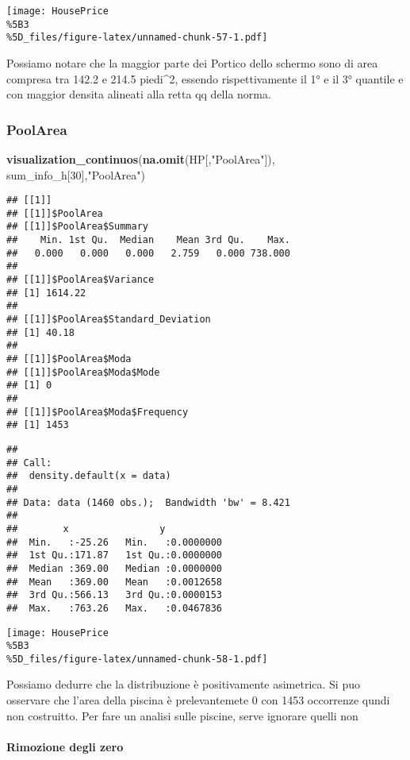 \documentclass[
]{article}
\newenvironment{Shaded}{\begin{snugshade}}{\end{snugshade}}
\newcommand{\DecValTok}[1]{\textcolor[rgb]{0.00,0.00,0.81}{#1}}
\newcommand{\FunctionTok}[1]{\textcolor[rgb]{0.13,0.29,0.53}{\textbf{#1}}}
\newcommand{\NormalTok}[1]{#1}
\newcommand{\StringTok}[1]{\textcolor[rgb]{0.31,0.60,0.02}{#1}}
\begin{document}
\texttt{[image: HousePrice\\\%5B3\\\%5D\_files/figure-latex/unnamed-chunk-57-1.pdf]}

Possiamo notare che la maggior parte dei Portico dello schermo sono di
area compresa tra 142.2 e 214.5 piedi\^{}2, essendo rispettivamente il
1° e il 3° quantile e con maggior densita alineati alla retta qq della
norma.

\subsubsection{PoolArea}\label{poolarea}

\begin{Shaded}
\begin{Highlighting}[]
\FunctionTok{visualization\_continuos}\NormalTok{(}\FunctionTok{na.omit}\NormalTok{(HP[,}\StringTok{"PoolArea"}\NormalTok{]), sum\_info\_h[}\DecValTok{30}\NormalTok{],}\StringTok{"PoolArea"}\NormalTok{)}
\end{Highlighting}
\end{Shaded}

\begin{verbatim}
## [[1]]
## [[1]]$PoolArea
## [[1]]$PoolArea$Summary
##    Min. 1st Qu.  Median    Mean 3rd Qu.    Max. 
##   0.000   0.000   0.000   2.759   0.000 738.000 
## 
## [[1]]$PoolArea$Variance
## [1] 1614.22
## 
## [[1]]$PoolArea$Standard_Deviation
## [1] 40.18
## 
## [[1]]$PoolArea$Moda
## [[1]]$PoolArea$Moda$Mode
## [1] 0
## 
## [[1]]$PoolArea$Moda$Frequency
## [1] 1453
\end{verbatim}

\begin{verbatim}
## 
## Call:
##  density.default(x = data)
## 
## Data: data (1460 obs.);  Bandwidth 'bw' = 8.421
## 
##        x                y            
##  Min.   :-25.26   Min.   :0.0000000  
##  1st Qu.:171.87   1st Qu.:0.0000000  
##  Median :369.00   Median :0.0000000  
##  Mean   :369.00   Mean   :0.0012658  
##  3rd Qu.:566.13   3rd Qu.:0.0000153  
##  Max.   :763.26   Max.   :0.0467836
\end{verbatim}

\texttt{[image: HousePrice\\\%5B3\\\%5D\_files/figure-latex/unnamed-chunk-58-1.pdf]}

Possiamo dedurre che la distribuzione è positivamente asimetrica. Si puo
osservare che l'area della piscina è prelevantemete 0 con 1453
occorrenze qundi non costruitto. Per fare un analisi sulle piscine,
serve ignorare quelli non

\paragraph{Rimozione degli zero}\label{rimozione-degli-zero-13}
\end{document}

